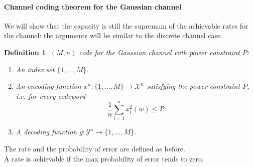 \documentclass[a4paper, 11pt, openany]{book}
\numberwithin{equation}{section}
\theoremstyle{plain}
\newtheorem{definition}	[equation]	{Definition}
\theoremstyle{definition}
\newcommand{\Structure}[1]{\textcolor{blue}{#1}}
\newcommand{\alphabet}[1]{\mathcal{#1}}
\begin{document}
\paragraph{Channel coding theorem for the Gaussian channel}

We will show that the capacity is still the supremum of the achievable rates for the channel: the arguments will be similar to the discrete channel case.

\begin{definition}
$(M,n)$ code for the Gaussian channel with power constraint $P$:
\begin{enumerate}
	\item An index set $\{1,\ldots, M\}$.
	
	\item An encoding function $x^n: \{1,\ldots,M\} \to \alphabet{X}^n$ satisfying the power constraint $P$, i.e. for every codeword
	$$
		\frac{1}{n} \sum_{i=1}^n x_i^2(w) \le P.
	$$
	
	\item A decoding function $g: \alphabet{Y}^n \to \{1,\ldots, M\}$.
\end{enumerate}
\end{definition}

The rate and the probability of error are defined as before.\\
A rate is achievable if the max probability of error tends to zero.




	
	
	
\end{document}
